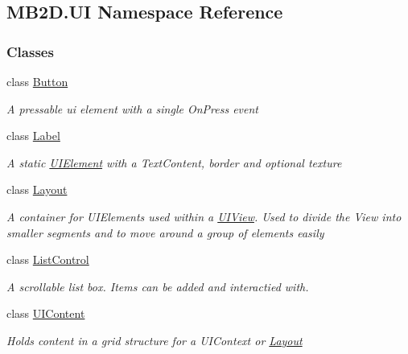 \hypertarget{namespace_m_b2_d_1_1_u_i}{}\subsection{M\+B2\+D.\+UI Namespace Reference}
\label{namespace_m_b2_d_1_1_u_i}
\subsubsection*{Classes}
\begin{DoxyCompactItemize}
\item 
class \hyperlink{class_m_b2_d_1_1_u_i_1_1_button}{Button}
\begin{DoxyCompactList}\small\item\em A pressable ui element with a single On\+Press event \end{DoxyCompactList}\item 
class \hyperlink{class_m_b2_d_1_1_u_i_1_1_label}{Label}
\begin{DoxyCompactList}\small\item\em A static \hyperlink{class_m_b2_d_1_1_u_i_1_1_u_i_element}{U\+I\+Element} with a Text\+Content, border and optional texture \end{DoxyCompactList}\item 
class \hyperlink{class_m_b2_d_1_1_u_i_1_1_layout}{Layout}
\begin{DoxyCompactList}\small\item\em A container for U\+I\+Elements used within a \hyperlink{class_m_b2_d_1_1_u_i_1_1_u_i_view}{U\+I\+View}. Used to divide the View into smaller segments and to move around a group of elements easily \end{DoxyCompactList}\item 
class \hyperlink{class_m_b2_d_1_1_u_i_1_1_list_control}{List\+Control}
\begin{DoxyCompactList}\small\item\em A scrollable list box. Items can be added and interactied with. \end{DoxyCompactList}\item 
class \hyperlink{class_m_b2_d_1_1_u_i_1_1_u_i_content}{U\+I\+Content}
\begin{DoxyCompactList}\small\item\em Holds content in a grid structure for a U\+I\+Context or \hyperlink{class_m_b2_d_1_1_u_i_1_1_layout}{Layout} \end{DoxyCompactList}\item 

\end{DoxyCompactItemize}
